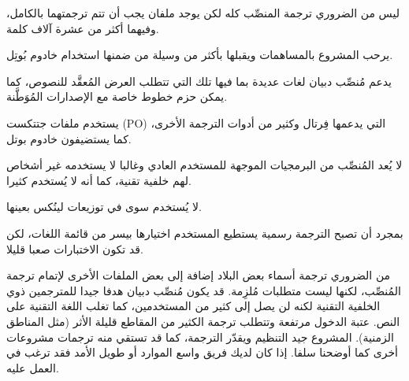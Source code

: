 \startitemize[1]
\item ليس من الضروري ترجمة المنصِّب كله لكن يوجد ملفان يجب أن تتم
ترجمتهما بالكامل، وفيهما أكثر من عشرة آلاف كلمة.
\item يرحب المشروع بالمساهمات ويقبلها بأكثر من وسيلة من ضمنها استخدام
خادوم بُوتِل.
\item يدعم مُنصِّب دبيان لغات عديدة بما فيها تلك التي تتطلب العرض
المُعقَّد للنصوص، كما يمكن حزم خطوط خاصة مع الإصدارات المُوَطَّنة.
\stopitemize
\startitemize[1]
\item يستخدم ملفات جتتكست (PO) التي يدعمها فِرتال وكثير من أدوات الترجمة
الأخرى، كما يستضيفون خادوم بوتل.
\stopitemize
\startitemize[1]
\item لا يُعد المُنصِّب من البرمجيات الموجهة للمستخدم العادي وغالبا لا
يستخدمه غير أشخاص لهم خلفية تقنية، كما أنه لا يُستخدم كثيرا.
\item لا يُستخدم سوى في توزيعات لينُكس بعينها.
\item بمجرد أن تصبح الترجمة رسمية يستطيع المستخدم اختيارها بيسر من قائمة
اللغات، لكن قد تكون الاختبارات صعبا قليلا.
\item من الضروري ترجمة أسماء بعض البلاد إضافة إلى بعض الملفات الأخرى
لإتمام ترجمة المُنصِّب، لكنها ليست متطلبات مُلزِمة.
\stopitemize
قد يكون مُنصِّب دبيان هدفا جيدا للمترجمين ذوي الخلفية التقنية لكنه لن
يصل إلى كثير من المستخدمين، كما تغلب اللغة التقنية على النص. عتبة
الدخول مرتفعة وتتطلب ترجمة الكثير من المقاطع قليلة الأثر (مثل المناطق
الزمنية). المشروع جيد التنظيم ويقدّر الترجمة، كما قد تستقي منه ترجمات
مشروعات أخرى كما أوضحنا سلفا. إذا كان لديك فريق واسع الموارد أو طويل
الأمد فقد ترغب في العمل عليه.
\endinput
